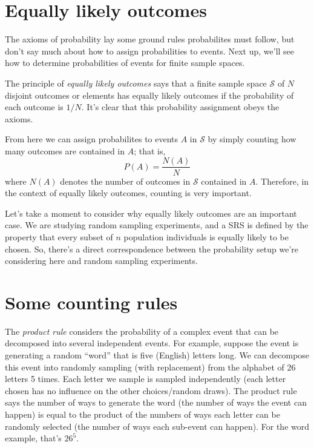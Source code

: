\documentclass[
]{book}
\begin{document}
\hypertarget{equally-likely-outcomes}{%
\section{Equally likely outcomes}\label{equally-likely-outcomes}}

The axioms of probability lay some ground rules probabilites must follow, but don't say much about how to assign probabilities to events. Next up, we'll see how to determine probabilities of events for finite sample spaces.

The principle of \emph{equally likely outcomes} says that a finite sample space \(\mathcal{S}\) of \(N\) disjoint outcomes or elements has equally likely outcomes if the probability of each outcome is \(1/N\). It's clear that this probability assignment obeys the axioms.

From here we can assign probabilites to events \(A\) in \(\mathcal{S}\) by simply counting how many outcomes are contained in \(A\); that is,
\[P(A) = \frac{N(A)}{N}\]
where \(N(A)\) denotes the number of outcomes in \(\mathcal{S}\) contained in \(A\). Therefore, in the context of equally likely outcomes, counting is very important.

Let's take a moment to consider why equally likely outcomes are an important case. We are studying random sampling experiments, and a SRS is defined by the property that every subset of \(n\) population individuals is equally likely to be chosen. So, there's a direct correspondence between the probability setup we're considering here and random sampling experiments.

\hypertarget{some-counting-rules}{%
\section{Some counting rules}\label{some-counting-rules}}

The \emph{product rule} considers the probability of a complex event that can be decomposed into several independent events. For example, suppose the event is generating a random ``word'' that is five (English) letters long. We can decompose this event into randomly sampling (with replacement) from the alphabet of 26 letters 5 times. Each letter we sample is sampled independently (each letter chosen has no influence on the other choices/random draws). The product rule says the number of ways to generate the word (the number of ways the event can happen) is equal to the product of the numbers of ways each letter can be randomly selected (the number of ways each sub-event can happen). For the word example, that's \(26^5\).
\end{document}
